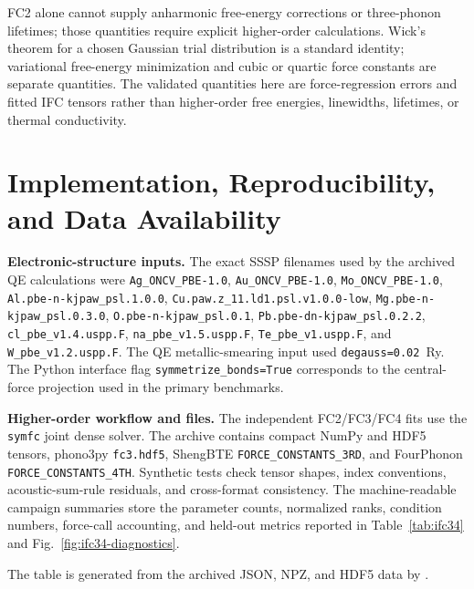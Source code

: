 \documentclass[aps,prb,reprint,amsmath,amssymb,floatfix]{revtex4-2}
\begin{document}
FC2 alone cannot supply anharmonic free-energy corrections or three-phonon
lifetimes; those quantities require explicit higher-order calculations. Wick's
theorem for a chosen Gaussian trial distribution is a standard identity;
variational free-energy minimization and cubic or quartic force constants are
separate quantities. The validated quantities here are force-regression errors
and fitted IFC tensors rather than higher-order free energies, linewidths,
lifetimes, or thermal conductivity.

\section{Implementation, Reproducibility, and Data Availability}
\label{appendix-k-reproducibility}

\textbf{Electronic-structure inputs.} The exact SSSP filenames used by the
archived QE calculations were \texttt{Ag\_ONCV\_PBE-1.0},
\texttt{Au\_ONCV\_PBE-1.0}, \texttt{Mo\_ONCV\_PBE-1.0},
\texttt{Al.pbe-n-kjpaw\_psl.1.0.0},
\texttt{Cu.paw.z\_11.ld1.psl.v1.0.0-low},
\texttt{Mg.pbe-n-kjpaw\_psl.0.3.0},
\texttt{O.pbe-n-kjpaw\_psl.0.1},
\texttt{Pb.pbe-dn-kjpaw\_psl.0.2.2},
\texttt{cl\_pbe\_v1.4.uspp.F}, \texttt{na\_pbe\_v1.5.uspp.F},
\texttt{Te\_pbe\_v1.uspp.F}, and \texttt{W\_pbe\_v1.2.uspp.F}. The QE
metallic-smearing input used \texttt{degauss=0.02}~Ry. The Python interface flag
\texttt{symmetrize\_bonds=True} corresponds to the central-force projection
used in the primary benchmarks.

\textbf{Higher-order workflow and files.} The independent FC2/FC3/FC4 fits use
the \texttt{symfc} joint dense solver. The archive contains compact NumPy and
HDF5 tensors, phono3py \texttt{fc3.hdf5}, ShengBTE
\texttt{FORCE\_CONSTANTS\_3RD}, and FourPhonon
\texttt{FORCE\_CONSTANTS\_4TH}. Synthetic tests check tensor shapes, index
conventions, acoustic-sum-rule residuals, and cross-format consistency. The
machine-readable campaign summaries store the parameter counts, normalized
ranks, condition numbers, force-call accounting, and held-out metrics reported
in Table~\ref{tab:ifc34} and Fig.~\ref{fig:ifc34-diagnostics}.

The table is generated from the archived JSON, NPZ, and HDF5 data by
.
\end{document}
